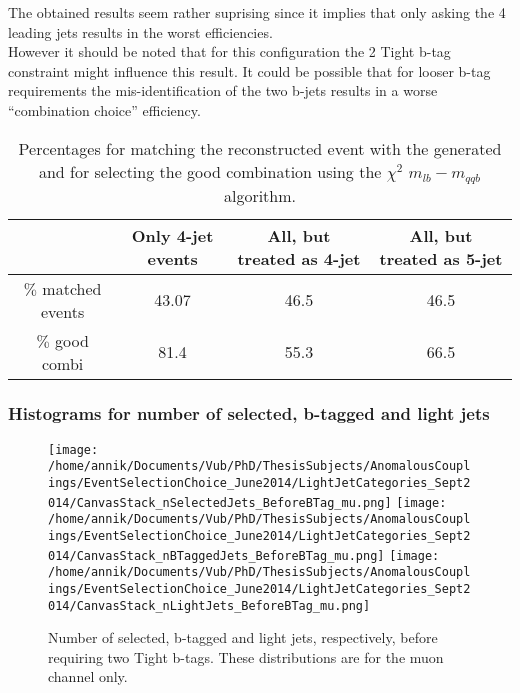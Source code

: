 \documentclass[a4paper,12pt]{report}
\begin{document}
The obtained results seem rather suprising since it implies that only asking the 4 leading jets results in the worst efficiencies. \\
However it should be noted that for this configuration the 2 Tight b-tag constraint might influence this result. It could be possible that for looser b-tag requirements the mis-identification of the two b-jets results in a worse ``combination choice'' efficiency.\\

\begin{table}[!h]
 \centering
 \begin{tabular}{c|c|c|c}
                         & Only 4-jet events & All, but treated as 4-jet & All, but treated as 5-jet  \\
  \hline
  $\%$ matched events    & 43.07                   & 46.5                               & 46.5  \\
  $\%$ good combi        & 81.4                    & 55.3                               & 66.5
 \end{tabular}
 \caption{Percentages for matching the reconstructed event with the generated and for selecting the good combination using the $\chi^{2}$ $m_{lb} - m_{qqb}$ algorithm. }\label{table::JetCategoryPercentages}
\end{table}

\subsubsection{Histograms for number of selected, b-tagged and light jets}\label{subsec::MSPlotsNBTaggedJets}
\begin{figure}[!h]
\texttt{[image: /home/annik/Documents/Vub/PhD/ThesisSubjects/AnomalousCouplings/EventSelectionChoice\_June2014/LightJetCategories\_Sept2014/CanvasStack\_nSelectedJets\_BeforeBTag\_mu.png]}
\texttt{[image: /home/annik/Documents/Vub/PhD/ThesisSubjects/AnomalousCouplings/EventSelectionChoice\_June2014/LightJetCategories\_Sept2014/CanvasStack\_nBTaggedJets\_BeforeBTag\_mu.png]}
\texttt{[image: /home/annik/Documents/Vub/PhD/ThesisSubjects/AnomalousCouplings/EventSelectionChoice\_June2014/LightJetCategories\_Sept2014/CanvasStack\_nLightJets\_BeforeBTag\_mu.png]}
\caption{Number of selected, b-tagged and light jets, respectively, before requiring two Tight b-tags. These distributions are for the muon channel only.}
\end{figure}
\end{document}

